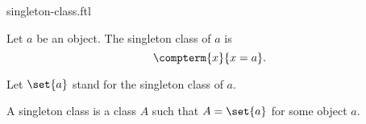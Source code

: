 \documentclass{article}
\begin{document}
\begin{smodule}{singleton-class.ftl}

    \begin{fdefinition*}[label=1160414603771904]
      Let $a$ be an object.
      The singleton class of $a$ is
      \[\compterm{x}{x = a}.\]
    \end{fdefinition*}

  \begin{fconvention*}
    Let $\set{a}$ stand for the singleton class of $a$.
  \end{fconvention*}

  \begin{fdefinition*}[label=6786618161627136]
    A singleton class is a class $A$ such that $A = \set{a}$ for some object $a$.
  \end{fdefinition*}
\end{smodule}
\end{document}
